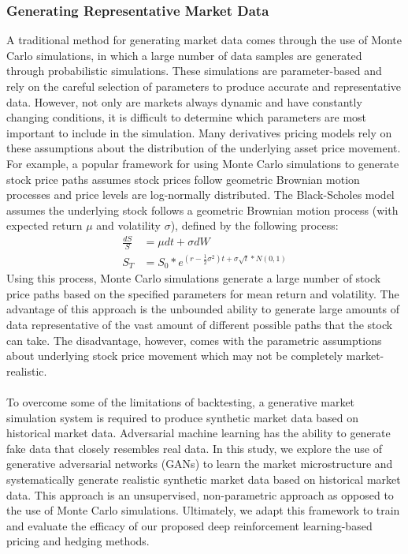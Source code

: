 \subsubsection{Generating Representative Market Data}
A traditional method for generating market data comes through the use of Monte Carlo simulations, in which a large number of data samples are generated through probabilistic simulations. These simulations are parameter-based and rely on the careful selection of parameters to produce accurate and representative data. However, not only are markets always dynamic and have constantly changing conditions, it is difficult to determine which parameters are most important to include in the simulation. Many derivatives pricing models rely on these assumptions about the distribution of the underlying asset price movement. For example, a popular framework for using Monte Carlo simulations to generate stock price paths assumes stock prices follow geometric Brownian motion processes and price levels are log-normally distributed. The Black-Scholes model assumes the underlying stock follows a geometric Brownian motion process (with expected return $\mu$ and volatility $\sigma$), defined by the following process:
\begin{equation}
\begin{aligned}
    \frac{dS}{S} &= \mu dt+\sigma dW\\
    S_T &= S_0*e^{(r-\frac{1}{2}\sigma^2)t+\sigma\sqrt{t}*N(0,1)}
\end{aligned}
\end{equation}
Using this process, Monte Carlo simulations generate a large number of stock price paths based on the specified parameters for mean return and volatility. The advantage of this approach is the unbounded ability to generate large amounts of data representative of the vast amount of different possible paths that the stock can take. The disadvantage, however, comes with the parametric assumptions about underlying stock price movement which may not be completely market-realistic.
\\
\\
To overcome some of the limitations of backtesting, a generative market simulation system is required to produce synthetic market data based on historical market data. Adversarial machine learning has the ability to generate fake data that closely resembles real data. In this study, we explore the use of generative adversarial networks (GANs) to learn the market microstructure and systematically generate realistic synthetic market data based on historical market data. This approach is an unsupervised, non-parametric approach as opposed to the use of Monte Carlo simulations. Ultimately, we adapt this framework to train and evaluate the efficacy of our proposed deep reinforcement learning-based pricing and hedging methods.

